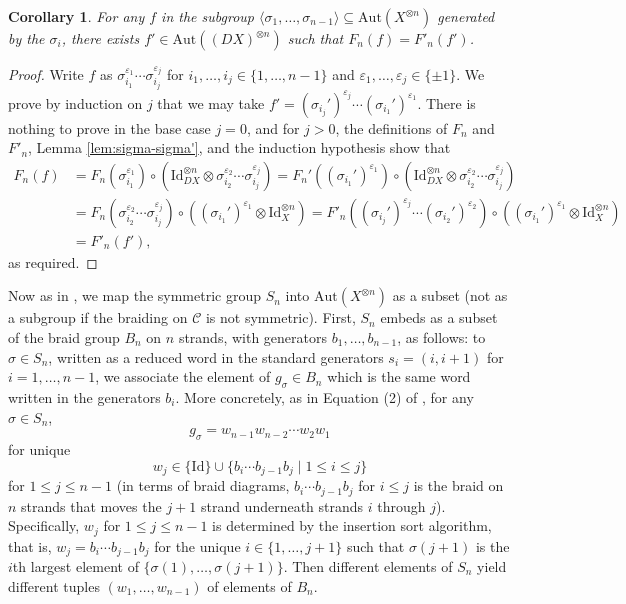 \documentclass[11pt, reqno]{amsart}
\newtheorem{cor}[thm]{Corollary}
\theoremstyle{definition}\newtheorem{defi}[thm]{Definition}
\theoremstyle{definition}\newtheorem{rem}[thm]{Remark}
\theoremstyle{definition}\newtheorem{exam}[thm]{Example}
\theoremstyle{definition}\newtheorem{assum}[thm]{Assumption}
\newcommand{\cC}{\mathcal{C}}
\newcommand{\Id}{\mathrm{Id}}
\begin{document}
\begin{cor}\label{cor:f'-existence}
For any $f$ in the subgroup $\langle \sigma_1,\ldots,\sigma_{n-1}\rangle\subseteq\mathrm{Aut}(X^{\otimes n})$ generated by the $\sigma_i$, there exists $f'\in\mathrm{Aut}((DX)^{\otimes n})$ such that $F_{n}(f) =F'_{n}(f')$.
\end{cor}
\begin{proof}
Write $f$ as $\sigma_{i_1}^{\varepsilon_1}\cdots\sigma_{i_j}^{\varepsilon_j}$ for $i_1,\ldots,i_j\in\lbrace 1,\ldots, n-1\rbrace$ and $\varepsilon_1,\ldots,\varepsilon_j\in\lbrace\pm 1\rbrace$. We prove by induction on $j$ that we may take $f'=(\sigma_{i_j}')^{\varepsilon_j}\cdots(\sigma_{i_1}')^{\varepsilon_1}$. There is nothing to prove in the base case $j=0$, and for $j>0$, the definitions of $F_{n}$ and $F'_{n}$, Lemma \ref{lem:sigma-sigma'}, and the induction hypothesis show that
\begin{align*}
F_{n}(f) & = F_{n}(\sigma_{i_1}^{\varepsilon_1})\circ(\Id_{DX}^{\otimes n}\otimes\sigma_{i_2}^{\varepsilon_2}\cdots\sigma_{i_j}^{\varepsilon_j}) = F_{n}'((\sigma_{i_1}')^{\varepsilon_1})\circ(\Id_{DX}^{\otimes n}\otimes\sigma_{i_2}^{\varepsilon_2}\cdots\sigma_{i_j}^{\varepsilon_j}) \\
& = F_{n}(\sigma_{i_2}^{\varepsilon_2}\cdots\sigma_{i_j}^{\varepsilon_j})\circ((\sigma_{i_1}')^{\varepsilon_1}\otimes\Id_X^{\otimes n}) =F'_{n}((\sigma_{i_j}')^{\varepsilon_j}\cdots(\sigma_{i_2}')^{\varepsilon_2})\circ((\sigma_{i_1}')^{\varepsilon_1}\otimes\Id_X^{\otimes n})\\
& = F'_{n}(f'),
\end{align*}
as required.
\end{proof}

Now as in \cite[Section 2.1]{EP}, we map the symmetric group $S_n$ into $\mathrm{Aut}(X^{\otimes n})$ as a subset (not as a subgroup if the braiding on $\cC$ is not symmetric). First, $S_n$ embeds as a subset of the braid group $B_n$ on $n$ strands, with generators $b_1,\ldots,b_{n-1}$, as follows: to $\sigma\in S_n$, written as a reduced word in the standard generators $s_i=(i,i+1)$ for $i=1,\ldots, n-1$, we associate the element of $g_\sigma\in B_n$ which is the same word written in the generators $b_i$. More concretely, as in Equation (2) of \cite{EP}, for any $\sigma\in S_n$,
\begin{equation}\label{eqn:f-sigma-decomp}
g_\sigma =w_{n-1} w_{n-2}\cdots w_2 w_1
\end{equation}
for unique
\begin{equation*}
w_j\in\lbrace \Id\rbrace\cup\lbrace b_i\cdots b_{j-1} b_j\mid 1\leq i\leq j\rbrace
\end{equation*}
for $1\leq j\leq n-1$ (in terms of braid diagrams, $b_i\cdots b_{j-1} b_j$ for $i\leq j$ is the braid on $n$ strands that moves the $j+1$ strand underneath strands $i$ through $j$). Specifically, $w_j$ for $1\leq j\leq n-1$ is determined by the insertion sort algorithm, that is, $w_j=b_i\cdots b_{j-1}b_j$ for the unique $i\in\lbrace 1,\ldots, j+1\rbrace$ such that $\sigma(j+1)$ is the $i$th largest element of $\lbrace \sigma(1),\ldots,\sigma(j+1)\rbrace$. Then different elements of $S_n$ yield different tuples $(w_1,\ldots, w_{n-1})$ of elements of $B_n$.
\end{document}
